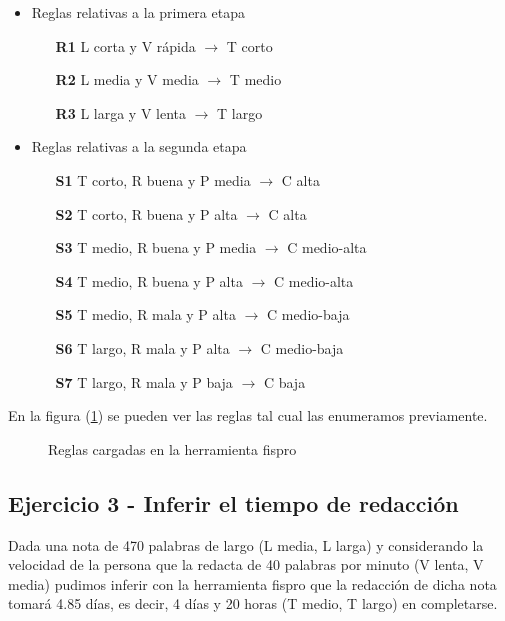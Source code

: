 \documentclass{article}
\begin{document}
\begin{itemize}
	\item Reglas relativas a la primera etapa
	\begin{itemize}
		\item [\textbf{R1}] L corta y V rápida $\rightarrow$ T corto
		\item [\textbf{R2}] L media y V media $\rightarrow$ T medio
		\item [\textbf{R3}] L larga y V lenta $\rightarrow$ T largo
	\end{itemize}
	\item Reglas relativas a la segunda etapa
	\begin{itemize}
		\item [\textbf{S1}] T corto, R buena y P media $\rightarrow$ C alta
		\item [\textbf{S2}] T corto, R buena y P alta $\rightarrow$ C alta
		\item [\textbf{S3}] T medio, R buena y P media $\rightarrow$ C medio-alta
		\item [\textbf{S4}] T medio, R buena y P alta $\rightarrow$ C medio-alta
		\item [\textbf{S5}] T medio, R mala y P alta $\rightarrow$ C medio-baja
		\item [\textbf{S6}] T largo, R mala y P alta $\rightarrow$ C medio-baja
		\item [\textbf{S7}]T largo, R mala y P baja $\rightarrow$ C baja
	\end{itemize}
\end{itemize}

En la figura (\ref{fig:reglas}) se pueden ver las reglas tal cual las enumeramos previamente.

\begin{figure}[H]
	\centering
	\caption{Reglas cargadas en la herramienta fispro}
	\label{fig:reglas}
\end{figure}

\subsection*{Ejercicio 3 - Inferir el tiempo de redacción}
Dada una nota de 470 palabras de largo (L media, L larga) y considerando la velocidad de la persona que la redacta de 40 palabras por minuto (V lenta, V media) pudimos inferir con la herramienta fispro que la redacción de dicha nota tomará 4.85 días, es decir, 4 días y 20 horas (T medio, T largo) en completarse.
\end{document}
